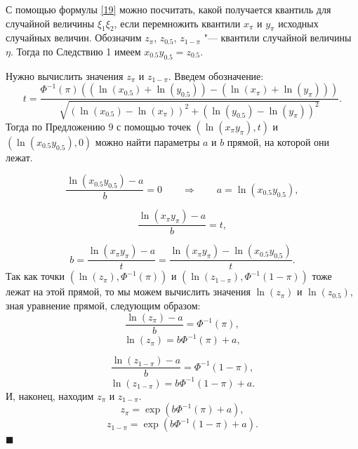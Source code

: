 \documentclass[12pt]{article}
\newenvironment{Proof}{\par\noindent{\bf Доказательство.}}{\hfill$\scriptstyle\blacksquare$}
\begin{document}
	\begin{Proof}
		С помощью формулы \eqref{19} можно посчитать, какой получается квантиль для случайной величины $\xi_{1}\xi_{2}$, если перемножить квантили $x_{\pi}$ и $y_{\pi}$ исходных случайных величин. Обозначим $z_{\pi}$, $z_{0.5}$, $z_{1-\pi}$ "--- квантили случайной величины $\eta$. Тогда по Следствию 1 имеем $x_{0.5}y_{0.5} = z_{0.5}$.
		
		Нужно вычислить значения $z_{\pi}$ и $z_{1-\pi}$. Введем обозначение:
		\begin{equation*}
			t = \frac{\Phi^{-1}(\pi)((\ln(x_{0.5})+\ln(y_{0.5}))-(\ln(x_{\pi})+\ln(y_{\pi})))}{\sqrt{(\ln(x_{0.5})-\ln(x_{\pi}))^{2}+(\ln(y_{0.5})-\ln(y_{\pi}))^{2}}}. 
		\end{equation*}
		Тогда по Предложению 9 с помощью точек $(\ln(x_{\pi}y_{\pi}), t)$ и $(\ln(x_{0.5}y_{0.5}),0)$  можно найти параметры $a$ и $b$ прямой, на которой они лежат.
		
		\begin{equation*}
			\dfrac{\ln(x_{0.5}y_{0.5})-a}{b}=0 \quad\quad \Rightarrow \quad\quad a=\ln(x_{0.5}y_{0.5}),
		\end{equation*}
		
		\begin{equation*}
			\dfrac{\ln(x_{\pi}y_{\pi})-a}{b}=t,
		\end{equation*}
		
		\begin{equation*}
			b=\dfrac{\ln(x_{\pi}y_{\pi})-a}{t}=\dfrac{\ln(x_{\pi}y_{\pi})-\ln(x_{0.5}y_{0.5})}{t}.
		\end{equation*}
		Так как точки $(\ln(z_{\pi}), \Phi^{-1}(\pi))$ и $(\ln(z_{1-\pi}), \Phi^{-1}(1-\pi))$ тоже лежат на этой прямой, то мы можем вычислить значения $\ln(z_{\pi})$ и $\ln(z_{0.5})$, зная уравнение прямой, следующим образом:
		\begin{equation*}
			\dfrac{\ln(z_{\pi})-a}{b}=\Phi^{-1}(\pi),
		\end{equation*}
		\begin{equation*}
			\ln(z_{\pi})=b\Phi^{-1}(\pi)+a,
		\end{equation*}
		
		\begin{equation*}
			\dfrac{\ln(z_{1-\pi})-a}{b}=\Phi^{-1}(1-\pi),
		\end{equation*}
		\begin{equation*}
			\ln(z_{1-\pi})=b\Phi^{-1}(1-\pi)+a.
		\end{equation*}
		И, наконец, находим $z_{\pi}$ и $z_{1-\pi}$.
		\begin{equation*}
			z_{\pi}=\exp(b\Phi^{-1}(\pi)+a),
		\end{equation*}
		\begin{equation*}
			z_{1-\pi}=\exp(b\Phi^{-1}(1-\pi)+a).
		\end{equation*}
	\end{Proof}
	
\end{document}
